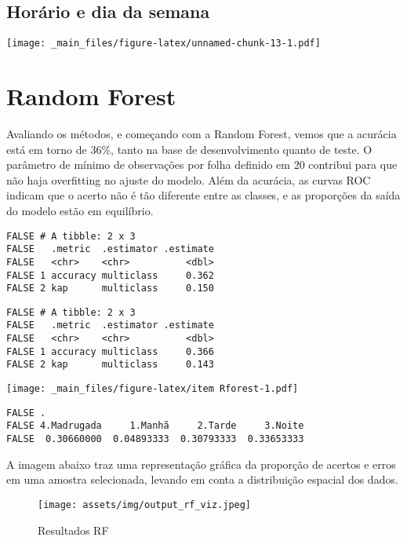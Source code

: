 \documentclass[
  12pt,
]{report}
\begin{document}
\hypertarget{horuxe1rio-e-dia-da-semana}{%
\subsection{Horário e dia da semana}\label{horuxe1rio-e-dia-da-semana}}

\texttt{[image: \_main\_files/figure-latex/unnamed-chunk-13-1.pdf]}

\hypertarget{random-forest-1}{%
\section{Random Forest}\label{random-forest-1}}

Avaliando os métodos, e começando com a Random Forest, vemos que a acurácia está em torno de 36\%, tanto na base de desenvolvimento quanto de teste. O parâmetro de mínimo de observações por folha definido em 20 contribui para que não haja overfitting no ajuste do modelo. Além da acurácia, as curvas ROC indicam que o acerto não é tão diferente entre as classes, e as proporções da saída do modelo estão em equilíbrio.

\begin{verbatim}
FALSE # A tibble: 2 x 3
FALSE   .metric  .estimator .estimate
FALSE   <chr>    <chr>          <dbl>
FALSE 1 accuracy multiclass     0.362
FALSE 2 kap      multiclass     0.150
\end{verbatim}

\begin{verbatim}
FALSE # A tibble: 2 x 3
FALSE   .metric  .estimator .estimate
FALSE   <chr>    <chr>          <dbl>
FALSE 1 accuracy multiclass     0.366
FALSE 2 kap      multiclass     0.143
\end{verbatim}

\texttt{[image: \_main\_files/figure-latex/item Rforest-1.pdf]}

\begin{verbatim}
FALSE .
FALSE 4.Madrugada     1.Manhã     2.Tarde     3.Noite 
FALSE  0.30660000  0.04893333  0.30793333  0.33653333
\end{verbatim}

A imagem abaixo traz uma representação gráfica da proporção de acertos e erros em uma amostra selecionada, levando em conta a distribuição espacial dos dados.

\begin{figure}
\centering
\texttt{[image: assets/img/output\_rf\_viz.jpeg]}
\caption{Resultados RF}
\end{figure}
\end{document}
